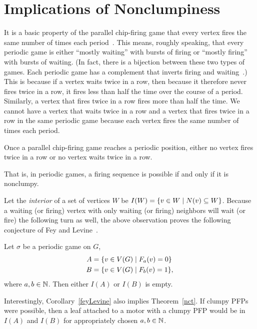\section{Implications of Nonclumpiness} \label{corollaries}
It is a basic property of the parallel chip-firing game that every vertex fires
the same number of times each period~\cite{jiang}. This means, roughly
speaking, that every periodic game is either ``mostly waiting'' with bursts of
firing or ``mostly firing'' with bursts of waiting. (In fact, there is a
bijection between these two types of games. Each periodic game has a complement
that inverts firing and waiting~\cite{jiang}.) This is because if a vertex
waits twice in a row, then because it therefore never fires twice in a row, it
fires less than half the time over the course of a period. Similarly, a vertex
that fires twice in a row fires more than half the time. We cannot have a
vertex that waits twice in a row and a vertex that fires twice in a row in the
same periodic game because each vertex fires the same number of times each
period.

\begin{cor}
Once a parallel chip-firing game reaches a periodic position, either no vertex
fires twice in a row or no vertex waits twice in a row.
\end{cor}

That is, in periodic games, a firing sequence is possible if and only if it is
nonclumpy.

Let the \emph{interior} of a set of vertices $W$ be $I(W) = \set{v \in W}{N(v)
  \subseteq W}$. Because a waiting (or firing) vertex with only waiting (or
firing) neighbors will wait (or fire) the following turn as well, the above
observation proves the following conjecture of Fey and
Levine~\cite{privateComms}.

\begin{cor}\label{feyLevine}
Let $\sigma$ be a periodic game on $G$,
\begin{align*}
  A &= \set{v \in \V}{\firing{v}{a} = 0} \\
  B &= \set{v \in \V}{\firing{v}{b} = 1},
\end{align*}
where $a,b \in \mathbb{N}$. Then either $I(A)$ or $I(B)$ is empty.
\end{cor}

Interestingly, Corollary~\ref{feyLevine} also implies Theorem~\ref{nct}. If
clumpy PFPs were possible, then a leaf attached to a motor with a clumpy PFP
would be in $I(A)$ and $I(B)$ for appropriately chosen $a,b \in \mathbb{N}$.

